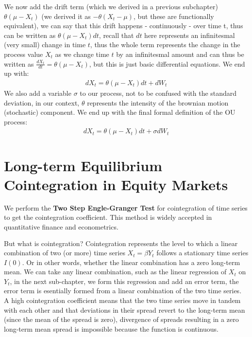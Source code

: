 \documentclass{article}
\begin{document}
\begin{spacing}{2.0}
We now add the drift term (which we derived in a previous subchapter) $\theta(\mu - X_{t})$ (we derived it as $-\theta(X_{t} - \mu)$, but these are functionally equivalent), we can say that this drift happens
- continuously - over time t, thus can be written as $\theta(\mu - X_{t}) dt$, recall that $dt$ here represents an infinitesmal (very small) change in time $t$, thus the whole term
represents the change in the process value $X_{t}$ as we change time $t$ by an infinitesmal amount and can thus be written as $\frac{d X_{t}}{dt} = \theta(\mu - X_{t})$, but this
is just basic differential equations. We end up with:
\begin{gather*}
    dX_{t} = \theta(\mu - X_{t}) dt + dW_{t}
\end{gather*}
We also add a variable $\sigma$ to our process, not to be confused with the standard deviation, in our context, $\theta$ represents the intensity of the brownian motion (stochastic)
component. We end up with the final formal definition of the OU process:
\begin{gather*}
    dX_{t} = \theta(\mu - X_{t}) dt + \sigma dW_{t}
\end{gather*}


\section{Long-term Equilibrium Cointegration in Equity Markets}

We perform the \textbf{Two Step Engle-Granger Test} for cointegration of time series to get the cointegration coefficient. This method is widely accepted
in quantitative finance and econometrics.

But what is cointegration? Cointegration represents the level to which a linear combination
of two (or more) time series $X_{t} = \beta Y_{t}$ follows a stationary time series $I(0)$.
Or in other words, whether the linear combination has a zero long-term mean. We can take
any linear combination, such as the linear regression of $X_{t}$ on $Y_{t}$, in the next
sub-chapter, we form this regression and add an error term, the error term is esentially
formed from a linear combination of the two time series. A high cointegration coefficient
means that the two time series move in tandem with each other and that deviations in their
spread revert to the long-term mean (since the mean of the spread is zero), divergence of
spreads resulting in a zero long-term mean spread is impossible because the function is
continuous.


\end{spacing}
\end{document}
